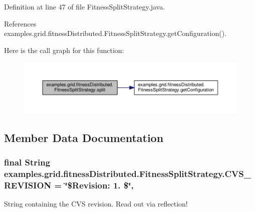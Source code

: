 Definition at line 47 of file Fitness\-Split\-Strategy.\-java.



References examples.\-grid.\-fitness\-Distributed.\-Fitness\-Split\-Strategy.\-get\-Configuration().



Here is the call graph for this function\-:
\nopagebreak
\begin{figure}[H]
\begin{center}
\leavevmode
\includegraphics[width=350pt]{classexamples_1_1grid_1_1fitness_distributed_1_1_fitness_split_strategy_a83129f8f6b859f0f68e137794153900e_cgraph}
\end{center}
\end{figure}




\subsection{Member Data Documentation}
\hypertarget{classexamples_1_1grid_1_1fitness_distributed_1_1_fitness_split_strategy_abb77241590a641d668ccecee9e99a33a}{
\subsubsection[{C\-V\-S\-\_\-\-R\-E\-V\-I\-S\-I\-O\-N}]{\setlength{\rightskip}{0pt plus 5cm}final String examples.\-grid.\-fitness\-Distributed.\-Fitness\-Split\-Strategy.\-C\-V\-S\-\_\-\-R\-E\-V\-I\-S\-I\-O\-N = \char`\"{}\$Revision\-: 1. \$\char`\"{}\hspace{0.3cm}{\ttfamily [static]}, {\ttfamily [private]}}}\label{classexamples_1_1grid_1_1fitness_distributed_1_1_fitness_split_strategy_abb77241590a641d668ccecee9e99a33a}
String containing the C\-V\-S revision. Read out via reflection! 


